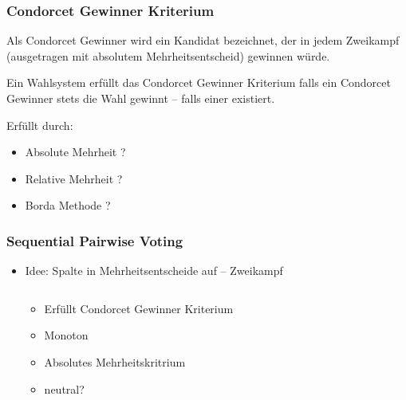 \documentclass{beamer}
\begin{document}
\begin{frame}[fragile]
	\frametitle{Condorcet Gewinner Kriterium}

	\begin{definition}
		Als Condorcet Gewinner wird ein Kandidat bezeichnet, der in jedem Zweikampf (ausgetragen mit absolutem Mehrheitsentscheid) gewinnen würde.
		
		Ein Wahlsystem erfüllt das Condorcet Gewinner Kriterium falls ein Condorcet Gewinner stets die Wahl gewinnt -- falls einer existiert.
	\end{definition}
	
	Erfüllt durch:
	\pause
	\begin{itemize}
		\item Absolute Mehrheit ? \pause \Checkmark \pause
		\item Relative Mehrheit ? \pause \XSolidBrush \pause
		\item Borda Methode ? \pause \XSolidBrush
	\end{itemize}
\end{frame}


\begin{frame}[fragile]
	\frametitle{Sequential Pairwise Voting}
	\begin{itemize}
		\item Idee: Spalte in Mehrheitsentscheide auf -- Zweikampf
				
	
		\begin{columns}
				\begin{column}[t]{0.6\textwidth}
						\begin{block}{}
						\begin{itemize}
							\item Erfüllt Condorcet Gewinner Kriterium
							\item Monoton
							\item Absolutes Mehrheitskritrium
							\item neutral?
						\end{itemize}
						\end{block}
					\end{column}
					\begin{column}[t]{0.4\textwidth}
						\begin{block}
						
						
						
						\end{block}
					\end{column}
		\end{columns}
	\end{itemize}
	
\end{frame}
\end{document}
